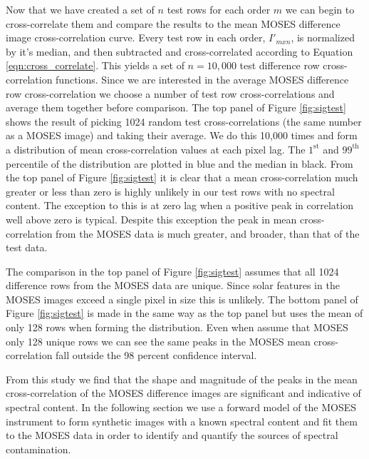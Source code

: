 		Now that we have created a set of $n$ test rows for each order $m$ we can begin to cross-correlate them and compare the results to the mean MOSES difference image cross-correlation curve.
		Every test row in each order, $I'_{mxn}$, is normalized by it's median, and then subtracted and cross-correlated according to Equation \ref{eqn:cross_correlate}.
		This yields a set of $n = 10,000$ test difference row cross-correlation functions.
		Since we are interested in the average MOSES difference row cross-correlation we choose a number of test row cross-correlations and average them together before comparison.
		The top panel of Figure \ref{fig:sigtest} shows the result of picking 1024 random test cross-correlations (the same number as a MOSES image) and taking their average.
		We do this 10,000 times and form a distribution of mean cross-correlation values at each pixel lag.
		The $1^\text{st}$ and $99^\text{th}$ percentile of the distribution are plotted in blue and the median in black.
		From the top panel of Figure \ref{fig:sigtest} it is clear that a mean cross-correlation much greater or less than zero is highly unlikely in our test rows with no spectral content.
		The exception to this is at zero lag when a positive peak in correlation well above zero is typical.
		Despite this exception the peak in mean cross-correlation from the MOSES data is much greater, and broader, than that of the test data.
		
		The comparison in the top panel of Figure \ref{fig:sigtest} assumes that all 1024 difference rows from the MOSES data are unique.
		Since solar features in the MOSES images exceed a single pixel in size this is unlikely.
		The bottom panel of Figure \ref{fig:sigtest} is made in the same way as the top panel but uses the mean of only 128 rows when forming the distribution.
		Even when assume that MOSES only 128 unique rows we can see the same peaks in the MOSES mean cross-correlation fall outside the 98 percent confidence interval.
		
		From this study we find that the shape and magnitude of the peaks in the mean cross-correlation of the MOSES difference images are significant and indicative of spectral content.
		In the following section we use a forward model of the MOSES instrument to form synthetic images with a known spectral content and fit them to the MOSES data in order to identify and quantify the sources of spectral contamination.
			
	
